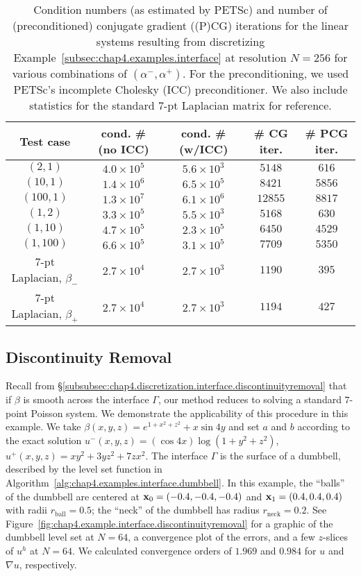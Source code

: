 \begin{table}[htbp]
\centering
\begin{tabular}{|c|c|c|c|c|}
\hline
Test case & cond. \# (no ICC) & cond. \# (w/ICC) & \# CG iter. & \# PCG iter. \\
\hline
$(2,1)$ & $4.0 \times 10^5$ & $5.6 \times 10^3$ & $5148$ & $616$ \\
\hline
$(10,1)$ & $1.4 \times 10^6$ & $6.5 \times 10^5$ & $8421$ & $5856$ \\
\hline
$(100,1)$ & $1.3 \times 10^7$ & $6.1 \times 10^6$ & $12855$ & $8817$ \\
\hline
$(1,2)$ & $3.3 \times 10^5$ & $5.5 \times 10^3$ & $5168$ & $630$ \\
\hline
$(1,10)$ & $4.7 \times 10^5$ & $2.3 \times 10^5$ & $6450$ & $4529$ \\
\hline
$(1,100)$ & $6.6 \times 10^5$ & $3.1 \times 10^5$ & $7709$ & $5350$ \\
\hline
$7$-pt Laplacian, $\beta_-$ & $2.7 \times 10^4$ & $2.7 \times 10^3$ & $1190$ & $395$ \\
\hline
$7$-pt Laplacian, $\beta_+$ & $2.7 \times 10^4$ & $2.7 \times 10^3$ & $1194$ & $427$ \\
\hline
\end{tabular}
\caption{Condition numbers (as estimated by PETSc) and number of (preconditioned) conjugate gradient ((P)CG) iterations for the linear systems resulting from discretizing Example~\ref{subsec:chap4.examples.interface} at resolution $N = 256$ for various combinations of $(\alpha^-, \alpha^+)$. For the preconditioning, we used PETSc's incomplete Cholesky (ICC) preconditioner. We also include statistics for the standard $7$-pt Laplacian matrix for reference.}
\label{tab:chap4.examples.interface}
\end{table} 

\subsection{Discontinuity Removal} \label{subsubsec:chap4.example.interface.discontinuityremoval}

Recall from \S\ref{subsubsec:chap4.discretization.interface.discontinuityremoval} that if $\beta$ is smooth across the interface $\Gamma$, our method reduces to solving a standard $7$-point Poisson system. We demonstrate the applicability of this procedure in this example. We take $\beta(x,y,z) = e^{1 + x^2 + z^2} + x \sin 4y$ and set $a$ and $b$ according to the exact solution $u^-(x,y,z) = (\cos 4x) \log(1 + y^2 + z^2)$, $u^+(x,y,z) = x y^2 + 3 y z^2 + 7 z x^2$. The interface $\Gamma$ is the surface of a dumbbell, described by the level set function in Algorithm~\ref{alg:chap4.examples.interface.dumbbell}. In this example, the ``balls'' of the dumbbell are centered at $\mathbf{x}_0 = (-0.4,-0.4,-0.4)$ and $\mathbf{x}_1 = (0.4,0.4,0.4)$ with radii $r_{\text{ball}} = 0.5$; the ``neck'' of the dumbbell has radius $r_{\text{neck}} = 0.2$. See Figure~\ref{fig:chap4.example.interface.discontinuityremoval} for a graphic of the dumbbell level set at $N = 64$, a convergence plot of the errors, and a few $z$-slices of $u^h$ at $N = 64$. We calculated convergence orders of $1.969$ and $0.984$ for $u$ and $\nabla u$, respectively.


